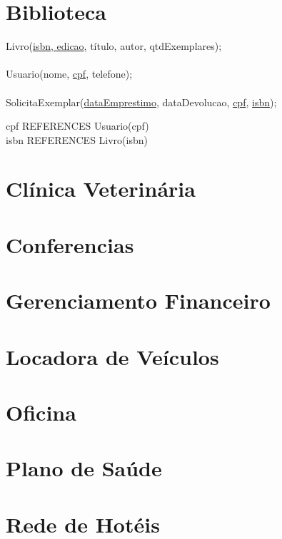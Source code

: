 \documentclass[12pt,a4paper]{article}
\begin{document}
\section*{Biblioteca}
Livro(\underline{isbn, edicao}, título, autor, qtdExemplares); \\ \\
Usuario(nome, \underline{cpf}, telefone); \\ \\
SolicitaExemplar(\underline{dataEmprestimo}, dataDevolucao, \underline{cpf}, \underline{isbn});
\begin{center}
	cpf REFERENCES Usuario(cpf) \\
	isbn REFERENCES Livro(isbn)
\end{center}

\newpage
\section*{Clínica Veterinária}

\newpage
\section*{Conferencias}

\newpage
\section*{Gerenciamento Financeiro}

\newpage
\section*{Locadora de Veículos}

\newpage
\section*{Oficina}

\newpage
\section*{Plano de Saúde}

\newpage
\section*{Rede de Hotéis}
\end{document}
